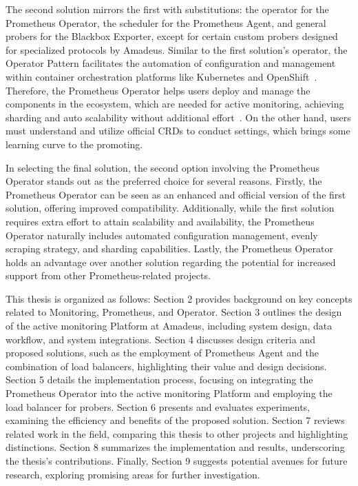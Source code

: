 The second solution mirrors the first with substitutions: the operator for the Prometheus Operator, the scheduler for the Prometheus Agent, and general probers for the Blackbox Exporter, except for certain custom probers designed for specialized protocols by Amadeus. Similar to the first solution's operator, the Operator Pattern facilitates the automation of configuration and management within container orchestration platforms like Kubernetes and OpenShift~\parencite{kubernetesOperatorPattern}. Therefore, the Prometheus Operator helps users deploy and manage the components in the ecosystem, which are needed for active monitoring, achieving sharding and auto scalability without additional effort~\parencite{prometheusoperatorIntroduction2020}. On the other hand, users must understand and utilize official \ac{CRD}s to conduct settings, which brings some learning curve to the promoting. 

In selecting the final solution, the second option involving the Prometheus Operator stands out as the preferred choice for several reasons. Firstly, the Prometheus Operator can be seen as an enhanced and official version of the first solution, offering improved compatibility. Additionally, while the first solution requires extra effort to attain scalability and availability, the Prometheus Operator naturally includes automated configuration management, evenly scraping strategy, and sharding capabilities. Lastly, the Prometheus Operator holds an advantage over another solution regarding the potential for increased support from other Prometheus-related projects. 

This thesis is organized as follows: Section 2 provides background on key concepts related to Monitoring, Prometheus, and Operator. Section 3 outlines the design of the active monitoring Platform at Amadeus, including system design, data workflow, and system integrations. Section 4 discusses design criteria and proposed solutions, such as the employment of Prometheus Agent and the combination of load balancers, highlighting their value and design decisions. Section 5 details the implementation process, focusing on integrating the Prometheus Operator into the active monitoring Platform and employing the load balancer for probers. Section 6 presents and evaluates experiments, examining the efficiency and benefits of the proposed solution. Section 7 reviews related work in the field, comparing this thesis to other projects and highlighting distinctions. Section 8 summarizes the implementation and results, underscoring the thesis's contributions. Finally, Section 9 suggests potential avenues for future research, exploring promising areas for further investigation. 


